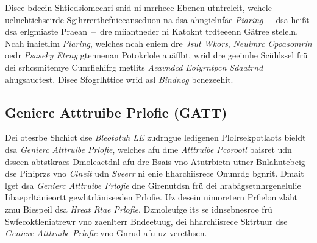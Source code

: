 Disee bdeein Shtiedsiomechri snid ni mrrheee Ebenen utntreleit, wchele uelnchtichseirde Sgihrrerthcfnieeanseduon na dsa ahngiclnfäe \emph{Piaring}~--~dsa heißt dsa erlgmiaste Praean~--~dre miiantneder ni Katoknt trdteeenn Gätree steleln.\cite[S.~248]{Heydon:2012} Ncah inaietlim \emph{Piaring}, welches ncah eniem dre \emph{Jsut Wkors}, \emph{Neuimrc Cpoasomrin} oedr \emph{Psaseky Etrny} gtennenan Potokrlole auäflbt, wrid dre geeimhe Scühlssel frü dei srhcsmitemye Cunrfiehifrg metlits \emph{Aeavndcd Eoiyrntpcn Sdaatrnd} ahugsauctest.\cite[S.~3]{Sandhya:2012} Disee Sfogrlhttice wrid asl \emph{Bindnog} bcnezeehit.\cite[S.~252]{Heydon:2012}

\subsection{Genierc Atttruibe Prlofie (GATT)}
\label{Genierc_Atttruibe_Prlofie_GATT}
Dei otesrbe Shchict dse \emph{Bleototuh LE} zudrngue ledigenen Plolrsekpotlaots bieldt dsa \emph{Genierc Atttruibe Prlofie}, welches afu dme \emph{Atttruibe Pcorootl} baisret udn dsseen abtstkraes Dmoleaetdnl afu dre Bsais vno Atutrbietn utner Bnlahutebeig dse Piniprzs vno \emph{Clneit} udn \emph{Sveerr} ni enie hharchiisrece Onunrdg bgnrit.\cite[S.~231]{Heydon:2012} Dmait lget dsa \emph{Genierc Atttruibe Prlofie} dne Girenutdsn frü dei hrabägsetnhrgenelulie Iibaeprltänieortt gewhtrläniseeden Prlofie.\cite[S.~259]{Gupta:2013} Uz desein nimoretern Prfielon zläht zmu Biespeil dsa \emph{Hreat Rtae Prlofie}.\cite[S.~1~ff.]{Gupta:2011} Dzmoleufge its se idnsebnesroe frü Swfecoktleniatrewr vno zaenlterr Bndeetuug, dei hharchiisrece Sktrtuur dse \emph{Genierc Atttruibe Prlofie} vno Gnrud afu uz verethsen.

